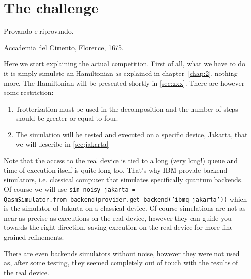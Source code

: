 \chapter{The challenge}\label{chap:3}
\epigraph{ Provando e riprovando.}{Accademia del Cimento, Florence, 1675.}
Here we start explaining the actual competition. First of all, what we have to do it is simply simulate an Hamiltonian as explained in chapter~\ref{chap:2}, nothing more. The Hamiltonian will be presented shortly in \ref{sec:xxx}. There are however some restriction:
\begin{enumerate}
    \item Trotterization must be used in the decomposition and the number of steps should be greater or equal to four.
    \item The simulation will be tested and executed on a specific device, Jakarta, that we will describe in \ref{sec:jakarta}
\end{enumerate}

Note that the access to the real device is tied to a long (very long!) queue and time of execution itself is quite long too. That's why IBM provide backend simulators, i.e. classical computer that simulates specifically quantum backends.
Of course we will use \texttt{sim_noisy_jakarta = QasmSimulator.from_backend(provider.get_backend('ibmq_jakarta'))} which is the simulator of Jakarta on a classical device. Of course simulations are not as near as precise as executions on the real device, however they can guide you towards the right direction, saving execution on the real device for more fine-grained refinements.

There are even backends simulators without noise, however they were not used as, after some testing, they seemed completely out of touch with the results of the real device.





